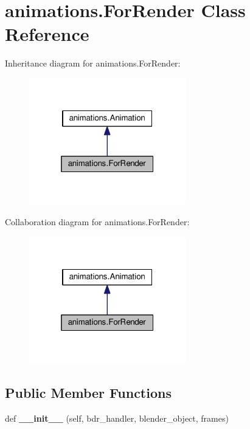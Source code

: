 \hypertarget{classanimations_1_1ForRender}{}\section{animations.\+For\+Render Class Reference}
\label{classanimations_1_1ForRender}


Inheritance diagram for animations.\+For\+Render\+:\nopagebreak
\begin{figure}[H]
\begin{center}
\leavevmode
\includegraphics[width=193pt]{classanimations_1_1ForRender__inherit__graph}
\end{center}
\end{figure}


Collaboration diagram for animations.\+For\+Render\+:\nopagebreak
\begin{figure}[H]
\begin{center}
\leavevmode
\includegraphics[width=193pt]{classanimations_1_1ForRender__coll__graph}
\end{center}
\end{figure}
\subsection*{Public Member Functions}
\begin{DoxyCompactItemize}
\item 
def {\bfseries \+\_\+\+\_\+init\+\_\+\+\_\+} (self, bdr\+\_\+handler, blender\+\_\+object, frames)\hypertarget{classanimations_1_1ForRender_a1ee4fa46efecc947a96953f5ff0d99b6}{}\label{classanimations_1_1ForRender_a1ee4fa46efecc947a96953f5ff0d99b6}

\end{DoxyCompactItemize}
